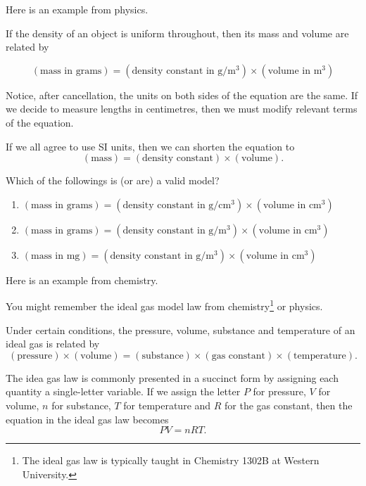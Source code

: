\documentclass[../book.tex]{subfiles}
\begin{document}
Here is an example from physics.

\begin{example} \label{eg:model-mass-density}
If the density of an object is uniform throughout, then its mass and volume are related by

\begin{equation}\label{eq:models-3}
(\text{mass in grams}) = (\text{density constant in } \text{g}/\text{m}^{3}) \times (\text{volume in }\text{m}^{3})
\end{equation}

Notice, after cancellation, the units on both sides of the equation are the same.  If we decide to measure lengths in centimetres, then we must modify relevant terms of the equation.

If we all agree to use SI units, then we can shorten the equation to
\begin{equation}\label{eq:models-4}
(\text{mass}) = (\text{density constant}) \times (\text{volume}).
\end{equation}
\end{example}

\begin{exercise} \label{ex:models-1}
Which of the followings is (or are) a valid model?
\begin{enumerate}
  \item \((\text{mass in grams}) = (\text{density constant in } \text{g}/\text{cm}^{3}) \times (\text{volume in }\text{cm}^{3})\)
  \item \((\text{mass in grams}) = (\text{density constant in } \text{g}/\text{m}^{3}) \times (\text{volume in }\text{cm}^{3})\)
  \item \((\text{mass in mg}) = (\text{density constant in } \text{g}/\text{m}^{3}) \times (\text{volume in }\text{cm}^{3})\)
\end{enumerate}
\end{exercise}

Here is an example from chemistry.

\begin{example} \label{eg:model-ideal-gas}
You might remember the ideal gas model law from chemistry\footnote{The ideal gas law is typically taught in Chemistry 1302B at Western University.} or physics.

Under certain conditions, the pressure, volume, substance and temperature of an ideal gas is related by
\begin{equation}\label{eq:models-5}
(\text{pressure}) \times (\text{volume}) = (\text{substance}) \times (\text{gas constant}) \times (\text{temperature}).
\end{equation}

The idea gas law is commonly presented in a succinct form by assigning each quantity a single-letter variable. If we assign the letter \(P\) for pressure, \(V\) for volume, \(n\) for substance, \(T\) for temperature and \(R\) for the gas constant, then the equation in the ideal gas law becomes
\begin{equation}\label{eq:models-6}
PV = nRT.
\end{equation}
\end{example}
\end{document}
